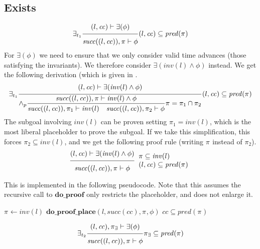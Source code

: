 \documentclass{article}
\newcommand{\proofrule}[3][]{#1 \frac{\raisebox{.7ex}{\normalsize{$#2$}}}
  {\raisebox{-1.0ex}{\normalsize{$#3$}}}}
\newcommand{\placeholder}[1][]{\pi_{#1}}
\newcommand{\loc}{l}
\newcommand{\region}{\mathit{cc}}
\newcommand{\suc}{\mathit{succ}}
\newcommand{\pre}{\mathit{pred}}
\newcommand{\inv}{\mathit{inv}}
\newcommand{\method}[1]{\ensuremath{\mathbf{#1}}}
\begin{document}
\subsection{Exists}

\[
\proofrule[\exists_{t_1}]
{(\loc, \region) \vdash \exists(\phi)}
{\suc((\loc, \region)), \placeholder \vdash \phi}
(\loc, \region) \subseteq \pre(\placeholder)
\]
%
For $\exists(\phi)$ we need to ensure that we only consider valid time advances (those satisfying the invariants).
We therefore consider $\exists(\inv(\loc) \land \phi)$ instead.
We get the following derivation (which is given in \cite[Appendix C.2]{FC:14}.
\[
\proofrule[\exists_{t_1}]
{(\loc, \region) \vdash \exists(\inv(\loc) \land \phi)}
{
  \proofrule[\land_p]
  {\suc((\loc, \region)), \placeholder \vdash \inv(\loc) \land \phi}
  {\suc((\loc, \region)), \placeholder[1] \vdash \inv(\loc)
  \quad \suc((\loc, \region)), \placeholder[2] \vdash \phi}
  \placeholder = \placeholder[1] \cap \placeholder[2]
}
(\loc, \region) \subseteq \pre(\placeholder)
\]
The subgoal involving $\inv(\loc)$ can be proven setting $\placeholder[1] = \inv(\loc)$, which is
the most liberal placeholder to prove the subgoal. If we take this simplification, this forces $\placeholder[2] \subseteq \inv(\loc)$,
and we get the following proof rule (writing $\placeholder$ instead of $\placeholder[2]$).
\[
\proofrule
{(\loc, \region) \vdash \exists(\inv(\loc) \land \phi)}
{\suc((\loc, \region)), \placeholder \vdash \phi}
\begin{array}{l}
\placeholder \subseteq \inv(\loc) \\
(\loc, \region) \subseteq \pre(\placeholder)
\end{array}
\]

This is implemented in the following pseudocode. Note that this assumes the recursive
call to \method{do\_proof} only restricts the placeholder, and does not enlarge it.

\begin{algorithm}[H]
\caption{$\method{do\_proof\_exists}(\loc, \region, \exists(\phi))$}
\begin{algorithmic}
\STATE $\placeholder \gets \inv(\loc)$ 
\STATE $\method{do\_proof\_place}(\loc, \suc(\region), \placeholder, \phi)$
\RETURN $\region \subseteq \pre(\placeholder)$
\end{algorithmic}
\end{algorithm}

\[
%
\proofrule[\exists_{t_2}]
{(\loc, \region), \placeholder[\exists] \vdash \exists(\phi)}
{\suc((\loc, \region)), \placeholder \vdash \phi}
\placeholder[\exists] \subseteq \pre(\placeholder)
\]
\end{document}
